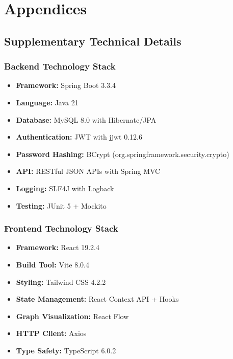 \documentclass[12pt,a4paper]{report}
\begin{document}
\newpage

\appendix
\chapter{Appendices}

\section{Supplementary Technical Details}\label{app:tech_details}

\subsection{Backend Technology Stack}

\begin{itemize}
  \item \textbf{Framework:} Spring Boot 3.3.4
  \item \textbf{Language:} Java 21
  \item \textbf{Database:} MySQL 8.0 with Hibernate/JPA
  \item \textbf{Authentication:} JWT with jjwt 0.12.6
  \item \textbf{Password Hashing:} BCrypt (org.springframework.security.crypto)
  \item \textbf{API:} RESTful JSON APIs with Spring MVC
  \item \textbf{Logging:} SLF4J with Logback
  \item \textbf{Testing:} JUnit 5 + Mockito
\end{itemize}

\subsection{Frontend Technology Stack}

\begin{itemize}
  \item \textbf{Framework:} React 19.2.4
  \item \textbf{Build Tool:} Vite 8.0.4
  \item \textbf{Styling:} Tailwind CSS 4.2.2
  \item \textbf{State Management:} React Context API + Hooks
  \item \textbf{Graph Visualization:} React Flow
  \item \textbf{HTTP Client:} Axios
  \item \textbf{Type Safety:} TypeScript 6.0.2
\end{itemize}
\end{document}
